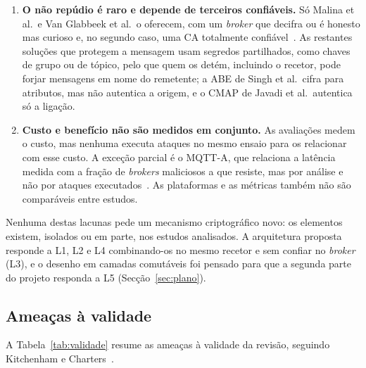 \begin{enumerate}[label=\textbf{L\arabic*.}, leftmargin=*]
{    confiança.} Oito dos 16 mecanismos dispensam essa confiança, quatro totalmente
    e quatro em parte; nos outros oito, cinco assumem-na, por desenho ou
    explicitamente~\cite[§IV-A]{calabretta2018mqttauth}, e três não tratam a
    questão. Mesmo entre os que a dispensam, a confiança passa muitas vezes para
    outro terceiro, como um servidor de chaves~\cite[§6]{dahlmanns2021entrust}, uma
    CA~\cite[§3.1]{vanglabbeek2022flexible} ou um TEE~\cite{segarra2020mqttz}.
  \item \textbf{O não repúdio é raro e depende de terceiros confiáveis.} Só Malina
    et al.\ e Van Glabbeek et al.\ o oferecem, com um \emph{broker} que decifra ou
    é honesto mas curioso e, no segundo caso, uma CA totalmente
    confiável~\cite[§3.1]{vanglabbeek2022flexible}. As restantes soluções que
    protegem a mensagem usam segredos partilhados, como chaves de grupo ou de
    tópico, pelo que quem os detém, incluindo o recetor, pode forjar mensagens em
    nome do remetente; a ABE de Singh et al.\ cifra para atributos, mas não
    autentica a origem, e o CMAP de Javadi et al.\ autentica só a
    ligação.
  \item \textbf{Custo e benefício não são medidos em conjunto.} As avaliações
    medem o custo, mas nenhuma executa ataques no mesmo ensaio para os relacionar com
    esse custo. A exceção parcial é o MQTT-A, que relaciona a latência medida com a
    fração de \emph{brokers} maliciosos a que resiste, mas por análise e não por
    ataques executados~\cite[§VIII-C]{buccafurri2023mqtta}. As plataformas e as
    métricas também não são comparáveis entre estudos.
\end{enumerate}

Nenhuma destas lacunas pede um mecanismo criptográfico novo: os elementos
existem, isolados ou em parte, nos estudos analisados. A arquitetura proposta responde a L1, L2 e L4
combinando-os no mesmo recetor e sem confiar no \emph{broker} (L3), e o desenho em
camadas comutáveis foi pensado para que a segunda parte do projeto responda a L5
(Secção~\ref{sec:plano}).

\subsection{Ameaças à validade}

A Tabela~\ref{tab:validade} resume as ameaças à validade da revisão, seguindo
Kitchenham e Charters~\cite{kitchenham2007}.

